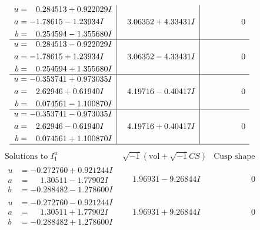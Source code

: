 \documentclass[1p]{elsarticle_modified}
\theoremstyle{definition}
\newcommand{\I}{\sqrt{-1}}
\begin{document}
$$\begin{array}{c|c|c}
\begin{aligned}
u &= \phantom{-}0.284513 + 0.922029 I \\
a &= -1.78615 - 1.23934 I \\
b &= \phantom{-}0.254594 - 1.355680 I\end{aligned}
 & \phantom{-}3.06352 + 4.33431 I & \phantom{-0.000000 } 0 \\ \hline\begin{aligned}
u &= \phantom{-}0.284513 - 0.922029 I \\
a &= -1.78615 + 1.23934 I \\
b &= \phantom{-}0.254594 + 1.355680 I\end{aligned}
 & \phantom{-}3.06352 - 4.33431 I & \phantom{-0.000000 } 0 \\ \hline\begin{aligned}
u &= -0.353741 + 0.973035 I \\
a &= \phantom{-}2.62946 + 0.61940 I \\
b &= \phantom{-}0.074561 - 1.100870 I\end{aligned}
 & \phantom{-}4.19716 - 0.40417 I & \phantom{-0.000000 } 0 \\ \hline\begin{aligned}
u &= -0.353741 - 0.973035 I \\
a &= \phantom{-}2.62946 - 0.61940 I \\
b &= \phantom{-}0.074561 + 1.100870 I\end{aligned}
 & \phantom{-}4.19716 + 0.40417 I & \phantom{-0.000000 } 0\\
 \hline 
 \end{array}$$\newpage$$\begin{array}{c|c|c}  
\text{Solutions to }I^u_{1}& \I (\text{vol} + \sqrt{-1}CS) & \text{Cusp shape}\\
 \hline 
\begin{aligned}
u &= -0.272760 + 0.921244 I \\
a &= \phantom{-}1.30511 - 1.77902 I \\
b &= -0.288482 - 1.278600 I\end{aligned}
 & \phantom{-}1.96931 - 9.26844 I & \phantom{-0.000000 } 0 \\ \hline\begin{aligned}
u &= -0.272760 - 0.921244 I \\
a &= \phantom{-}1.30511 + 1.77902 I \\
b &= -0.288482 + 1.278600 I\end{aligned}
 & \phantom{-}1.96931 + 9.26844 I & \phantom{-0.000000 } 0 \\ \hline\begin{aligned}

\end{aligned}
\end{array}$$
\end{document}
